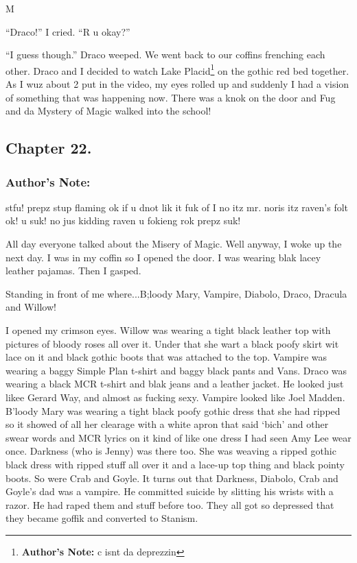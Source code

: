 M\documentclass{article}
\begin{document}
“Draco!” I cried. “R u okay?”

“I guess though.” Draco weeped. We went back to our coffins frenching each other. Draco and I decided to watch Lake Placid\footnote{\textbf{Author's Note: }c isnt da deprezzin} on the gothic red bed together. As I wuz about 2 put in the video, my eyes rolled up and suddenly I had a vision of something that was happening now. There was a knok on the door and Fug and da Mystery of Magic walked into the school!

\clearpage\nolinenumbers
\subsection*{Chapter 22.}

\subsubsection*{Author's Note: }stfu! prepz stup flaming ok if u dnot lik it fuk of I no itz mr. noris itz raven’s folt ok! u suk! no jus kidding raven u fokieng rok prepz suk!

\textbreak
\linenumbers\resetlinenumber

All day everyone talked about the Misery of Magic. Well anyway, I woke up the next day. I was in my coffin so I opened the door. I was wearing blak lacey leather pajamas. Then I gasped.

Standing in front of me where...B;loody Mary, Vampire, Diabolo, Draco, Dracula and Willow!

I opened my crimson eyes. Willow was wearing a tight black leather top with pictures of bloody roses all over it. Under that she wart a black poofy skirt wit lace on it and black gothic boots that was attached to the top. Vampire was wearing a baggy Simple Plan t-shirt and baggy black pants and Vans. Draco was wearing a black MCR t-shirt and blak jeans and a leather jacket. He looked just likee Gerard Way, and almost as fucking sexy. Vampire looked like Joel Madden. B’loody Mary was wearing a tight black poofy gothic dress that she had ripped so it showed of all her clearage with a white apron that said ‘bich’ and other swear words and MCR lyrics on it kind of like one dress I had seen Amy Lee wear once. Darkness (who is Jenny) was there too. She was weaving a ripped gothic black dress with ripped stuff all over it and a lace-up top thing and black pointy boots. So were Crab and Goyle. It turns out that Darkness, Diabolo, Crab and Goyle’s dad was a vampire. He committed suicide by slitting his wrists with a razor. He had raped them and stuff before too. They all got so depressed that they became goffik and converted to Stanism.
\end{document}
